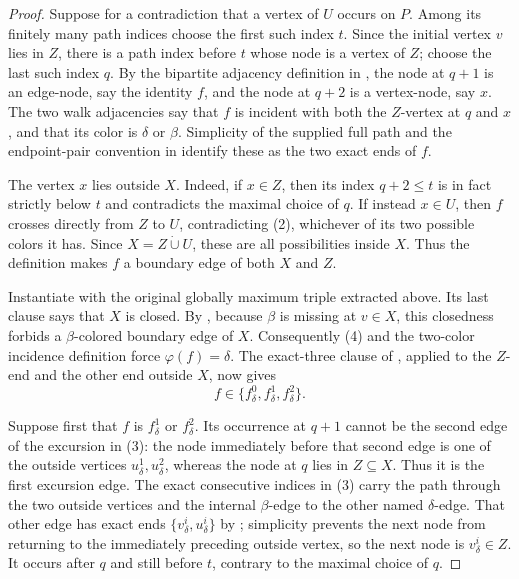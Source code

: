 \begin{proof}
Suppose for a contradiction that a vertex of $U$ occurs on $P$.  Among
its finitely many path indices choose the first such index $t$.  Since
the initial vertex $v$ lies in $Z$, there is a path index before $t$
whose node is a vertex of $Z$; choose the last such index $q$.  By the
bipartite adjacency definition in
, the node at $q+1$ is an edge-node,
say the identity $f$, and the node at $q+2$ is a vertex-node, say $x$.
The two walk adjacencies say that $f$ is incident with both the $Z$-vertex
at $q$ and $x$, and that its color is $\delta$ or $\beta$.  Simplicity
of the supplied full path and the endpoint-pair convention in
 identify these as the two exact ends of
$f$.

The vertex $x$ lies outside $X$.  Indeed, if $x\in Z$, then its index
$q+2\le t$ is in fact strictly below $t$ and contradicts the maximal
choice of $q$.  If instead $x\in U$, then $f$ crosses directly from $Z$
to $U$, contradicting (2), whichever of its two possible colors it has.
Since $X=Z\mathbin{\dot\cup}U$, these are all possibilities inside $X$.
Thus the definition  makes $f$ a boundary edge of
both $X$ and $Z$.                                                   

Instantiate  with the original
globally maximum triple extracted above.  Its last clause says that $X$
is closed.  By , because $\beta$ is
missing at $v\in X$, this closedness forbids a $\beta$-colored boundary
edge of $X$.  Consequently (4) and the two-color incidence definition
force $\varphi(f)=\delta$.  The
exact-three clause of , applied to the
$Z$-end and the other end outside $X$, now gives
\[
                 f\in\{f^0_\delta,f^1_\delta,f^2_\delta\}.          \tag{5}
\]

Suppose first that $f$ is $f^1_\delta$ or $f^2_\delta$.  Its occurrence
at $q+1$ cannot be the second edge of the excursion in (3): the node
immediately before that second edge is one of the outside vertices
$u^1_\delta,u^2_\delta$, whereas the node at $q$ lies in $Z\subseteq X$.
Thus it is the first excursion edge.  The exact consecutive indices in
(3) carry the path through the two outside vertices and the internal
$\beta$-edge to the other named $\delta$-edge.  That other edge has exact
ends $\{v^i_\delta,u^i_\delta\}$ by
; simplicity prevents the next node from
returning to the immediately preceding outside vertex, so the next node
is $v^i_\delta\in Z$.  It occurs after $q$ and still before $t$, contrary
to the maximal choice of $q$.


\end{proof}
